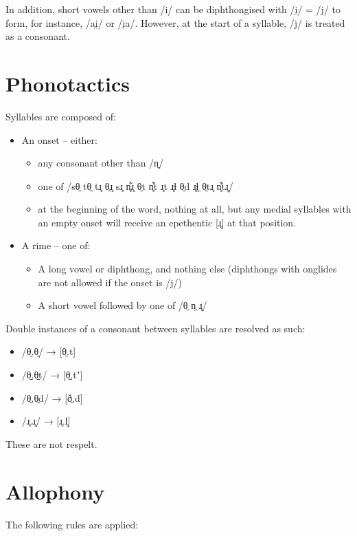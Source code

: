 \documentclass{book}
\begin{document}
In addition, short vowels other than /i/ can be diphthongised with /i̯/ = /j/ to form, for instance,  /ai̯/ or  /i̯a/. However, at the start of a syllable, /j/ is treated as a consonant.

\section{Phonotactics}

Syllables are composed of:

\begin{itemize}
  \item An onset -- either:
  \begin{itemize}
    \item any consonant other than  /n̼/
    \item one of  /sθ̠ tθ̠ tɹ̥ θ̠ɹ̥ sɹ̥ n̥͋ɹ̥ θ̠t n̥͋t ɹ̥t ɹ̥ɬ θ̠d ɹ̥ɬ̼ θ̠tɹ̥ n̥͋tɹ̥/
    \item at the beginning of the word, nothing at all, but any medial syllables with an empty onset will receive an epethentic [ɹ̥] at that position.
  \end{itemize}
  \item A rime – one of:
  \begin{itemize}
    \item A long vowel or diphthong, and nothing else (diphthongs with onglides are not allowed if the onset is  /j/)
    \item A short vowel followed by one of  /θ̠ n̼ ɹ̥/
  \end{itemize}
\end{itemize}

Double instances of a consonant between syllables are resolved as such:

\begin{itemize}
  \item /θ̠.θ̠/ → [θ̠.t]
  \item /θ̠.θ̠t/ → [θ̠.tʼ]
  \item /θ̠.θ̠d/ → [ð̠.d]
  \item /ɹ̥.ɹ̥/ → [ɹ̥.l̥]
\end{itemize}

These are not respelt.

\section{Allophony}

The following rules are applied:
\end{document}

